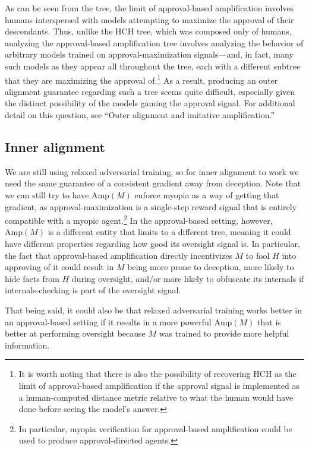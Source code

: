 \documentclass[
  onecolumn,
  natbib,
]{miri-tech-article}
\begin{document}
\noindent As can be seen from the tree, the limit of approval-based amplification involves humans interspersed with models attempting to maximize the approval of their descendants. Thus, unlike the HCH tree, which was composed only of humans, analyzing the approval-based amplification tree involves analyzing the behavior of arbitrary models trained on approval-maximization signals---and, in fact, many such models as they appear all throughout the tree, each with a different subtree that they are maximizing the approval of.\footnote{It is worth noting that there is also the possibility of recovering HCH as the limit of approval-based amplification if the approval signal is implemented as a human-computed distance metric relative to what the human would have done before seeing the model's answer.} As a result, producing an outer alignment guarantee regarding such a tree seems quite difficult, especially given the distinct possibility of the models gaming the approval signal. For additional detail on this question, see ``Outer alignment and imitative amplification.''\cite{outer_alignment}

\subsection{Inner alignment} We are still using relaxed adversarial training, so for inner alignment to work we need the same guarantee of a consistent gradient away from deception. Note that we can still try to have $\text{Amp}(M)$ enforce myopia as a way of getting that gradient, as approval-maximization is a single-step reward signal that is entirely compatible with a myopic agent.\footnote{In particular, myopia verification for approval-based amplification could be used to produce approval-directed agents.\cite{model_free}} In the approval-based setting, however, $\text{Amp}(M)$ is a different entity that limits to a different tree, meaning it could have different properties regarding how good its oversight signal is. In particular, the fact that approval-based amplification directly incentivizes $M$ to fool $H$ into approving of it could result in $M$ being more prone to deception, more likely to hide facts from $H$ during oversight, and/or more likely to obfuscate its internals if internals-checking is part of the oversight signal.

That being said, it could also be that relaxed adversarial training works better in an approval-based setting if it results in a more powerful $\text{Amp}(M)$ that is better at performing oversight because $M$ was trained to provide more helpful information.
\end{document}
